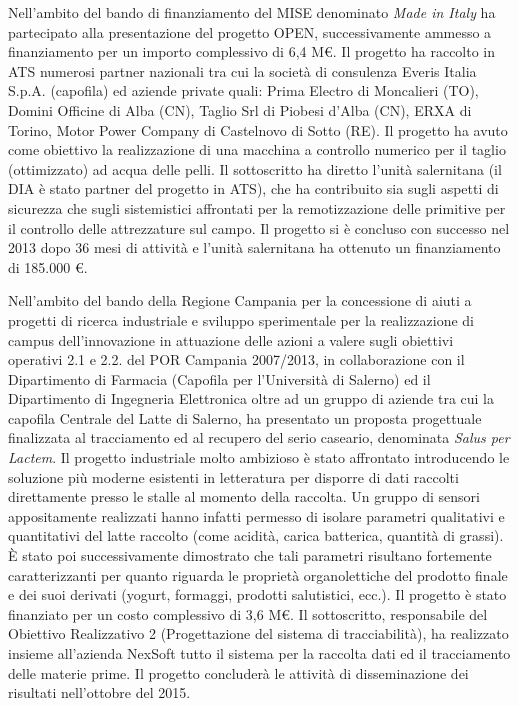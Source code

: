 \documentclass[11pt,a4paper,sans]{moderncv}        %
\begin{document}
{
Nell'ambito del bando di finanziamento del MISE denominato {\em Made in Italy} ha partecipato alla presentazione del progetto OPEN, successivamente ammesso a finanziamento per un importo complessivo di 6,4 M\euro{}. Il progetto ha raccolto in ATS numerosi partner nazionali tra cui la società di consulenza Everis Italia S.p.A. (capofila) ed aziende private quali: Prima Electro di Moncalieri (TO), Domini Officine di Alba (CN),  Taglio Srl di Piobesi d’Alba (CN), ERXA di Torino, Motor Power Company di Castelnovo di Sotto (RE). Il progetto ha avuto come obiettivo la realizzazione di una macchina a controllo numerico per il taglio (ottimizzato) ad acqua delle pelli. Il sottoscritto ha diretto l'unità salernitana (il DIA è stato partner del progetto in ATS), che ha contribuito sia sugli aspetti di sicurezza che sugli sistemistici affrontati per la remotizzazione delle primitive per il controllo delle attrezzature sul campo. Il progetto si è concluso con successo nel 2013 dopo 36 mesi di attività e l'unità salernitana ha ottenuto un finanziamento di 185.000 \euro{}. 
}

{
Nell'ambito del bando della Regione Campania per la concessione di aiuti a progetti di ricerca industriale e sviluppo sperimentale per la realizzazione di campus dell’innovazione in attuazione delle azioni  a valere sugli obiettivi operativi 2.1 e 2.2. del POR Campania 2007/2013, in collaborazione con il Dipartimento di Farmacia (Capofila per l'Università di Salerno) ed il Dipartimento di Ingegneria Elettronica oltre ad un gruppo di aziende tra cui la capofila Centrale del Latte di Salerno, ha presentato un proposta progettuale finalizzata al tracciamento ed al recupero del serio caseario, denominata {\em Salus per Lactem}. Il progetto industriale molto ambizioso è stato affrontato introducendo le soluzione più moderne esistenti in letteratura per disporre di dati raccolti direttamente presso le stalle al momento della raccolta. Un gruppo di sensori appositamente realizzati hanno infatti permesso di isolare parametri qualitativi e quantitativi del latte raccolto (come acidità, carica batterica, quantità di grassi). \`E stato poi successivamente dimostrato che tali parametri risultano fortemente caratterizzanti per quanto riguarda le proprietà organolettiche del prodotto finale e dei suoi derivati (yogurt, formaggi, prodotti salutistici, ecc.). Il progetto è stato finanziato per un costo complessivo di 3,6 M\euro{}.
Il sottoscritto, responsabile del Obiettivo Realizzativo 2 (Progettazione del sistema di tracciabilità), ha realizzato insieme all'azienda NexSoft tutto il sistema per la raccolta dati ed il tracciamento delle materie prime.
Il progetto concluderà le attività di disseminazione dei risultati nell'ottobre del 2015.
}
\end{document}
